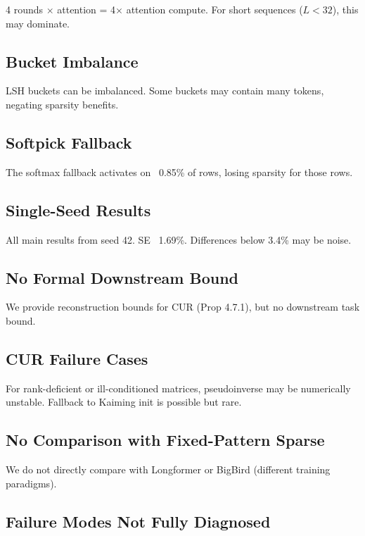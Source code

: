 4 rounds $\times$ attention = 4$\times$ attention compute. For short sequences 
($L < 32$), this may dominate.

\subsection{Bucket Imbalance}

LSH buckets can be imbalanced. Some buckets may contain many tokens, 
negating sparsity benefits.

\subsection{Softpick Fallback}

The softmax fallback activates on ~0.85\% of rows, losing 
sparsity for those rows.

\subsection{Single-Seed Results}

All main results from seed 42. SE ~1.69\%. Differences below 3.4\% 
may be noise.

\subsection{No Formal Downstream Bound}

We provide reconstruction bounds for CUR (Prop 4.7.1), but no downstream 
task bound.

\subsection{CUR Failure Cases}

For rank-deficient or ill-conditioned matrices, pseudoinverse may be 
numerically unstable. Fallback to Kaiming init is possible but rare.

\subsection{No Comparison with Fixed-Pattern Sparse}

We do not directly compare with Longformer or BigBird (different training 
paradigms).

\subsection{Failure Modes Not Fully Diagnosed}

